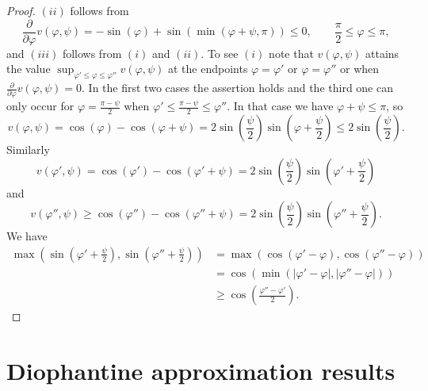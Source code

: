 \documentclass[oneside,english]{amsart}
\numberwithin{equation}{section}
\numberwithin{figure}{section}
\theoremstyle{plain}
\theoremstyle{plain}
\theoremstyle{plain}
\theoremstyle{definition}
\begin{document}
\begin{proof}
$(ii)$ follows from
\[
\frac{\partial}{\partial\varphi}v(\varphi,\psi)=-\sin(\varphi)+\sin\left(\min(\varphi+\psi,\pi)\right)\leq0,\qquad\frac{\pi}{2}\leq\varphi\leq\pi,
\]
and $(iii)$ follows from $(i)$ and $(ii)$. To see $(i)$ note that
$v(\varphi,\psi)$ attains the value $\sup_{\varphi'\leq\varphi\leq\varphi''}v(\varphi,\psi)$
at the endpoints $\varphi=\varphi'$ or $\varphi=\varphi''$ or when
$\frac{\partial}{\partial\varphi}v(\varphi,\psi)=0$. In the first
two cases the assertion holds and the third one can only occur for
$\varphi=\frac{\pi-\psi}{2}$ when $\varphi'\leq\frac{\pi-\psi}{2}\leq\varphi''$.
In that case we have $\varphi+\psi\leq\pi$, so
\[
v(\varphi,\psi)=\cos(\varphi)-\cos(\varphi+\psi)=2\sin\left(\frac{\psi}{2}\right)\sin\left(\varphi+\frac{\psi}{2}\right)\leq2\sin\left(\frac{\psi}{2}\right).
\]
Similarly
\[
v(\varphi',\psi)=\cos(\varphi')-\cos(\varphi'+\psi)=2\sin\left(\frac{\psi}{2}\right)\sin\left(\varphi'+\frac{\psi}{2}\right)
\]
and
\[
v(\varphi'',\psi)\geq\cos(\varphi'')-\cos(\varphi''+\psi)=2\sin\left(\frac{\psi}{2}\right)\sin\left(\varphi''+\frac{\psi}{2}\right).
\]
We have
\begin{align*}
\max\left(\sin\left(\varphi'+\frac{\psi}{2}\right),\sin\left(\varphi''+\frac{\psi}{2}\right)\right) & =\max\left(\cos\left(\varphi'-\varphi\right),\cos\left(\varphi''-\varphi\right)\right)\\
 & =\cos\left(\min\left(\left|\varphi'-\varphi\right|,\left|\varphi''-\varphi\right|\right)\right)\\
 & \geq\cos\left(\frac{\varphi''-\varphi'}{2}\right).
\end{align*}
\end{proof}

\section{Diophantine approximation results\label{sec:Diophantine}}
\end{document}
